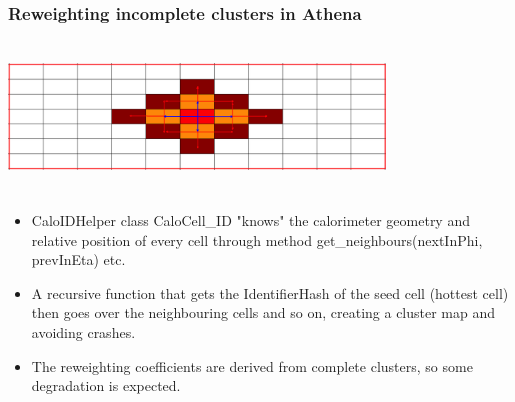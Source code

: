 \documentclass{beamer}
\begin{document}
\begin{frame}
\frametitle{Reweighting incomplete clusters in Athena}
\centering
\includegraphics[width=10cm,height=4cm]{cluster_mapping.png}\\
\begin{itemize}
\item CaloIDHelper class CaloCell\_ID "knows" the calorimeter geometry and relative position of every cell through method get\_neighbours(nextInPhi, prevInEta) etc. 
\item A recursive function that gets the IdentifierHash of the seed cell (hottest cell) then goes over the neighbouring cells and so on, creating a cluster map and avoiding crashes.
\item The reweighting coefficients are derived from complete clusters, so some degradation is expected.
\end{itemize}


\end{frame}
\end{document}
